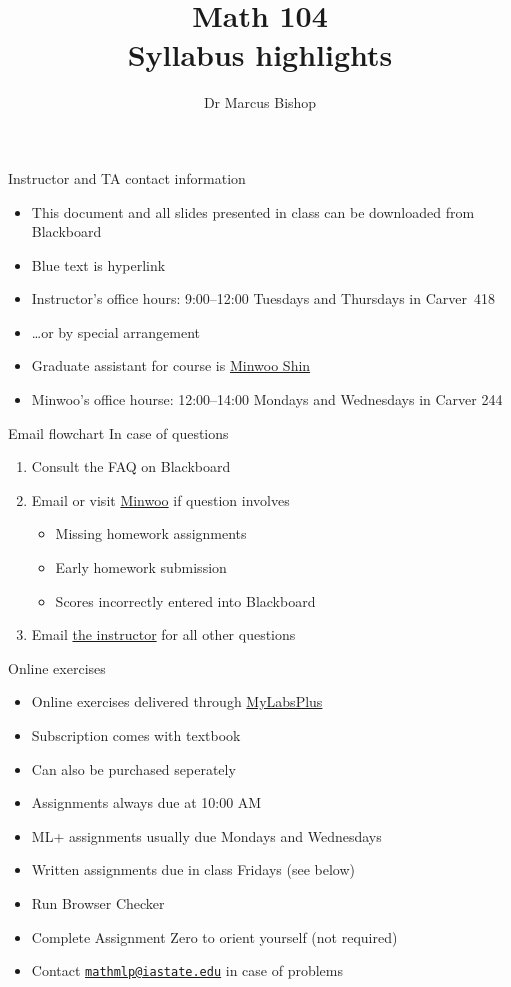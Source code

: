 \documentclass[handout,xcolor=dvipsnames]{beamer}
\title[Syllabus highlights]{Math 104\\Syllabus highlights}
\author{Dr Marcus Bishop}
\theoremstyle{definition}
\begin{document}
\begin{frame}\titlepage\end{frame}
\LogoOff

\begin{frame}{Instructor and TA contact information}
\begin{itemize}
\item This document and all slides presented in class
can be downloaded from Blackboard
\item Blue text is hyperlink
\item Instructor's office hours:
9:00--12:00 Tuesdays and Thursdays in Carver~418
\item \dots or by special arrangement
\item Graduate assistant for course is
\href{mailto:mws@iastate.edu}{\color{blue} Minwoo Shin}
\item Minwoo's office hourse:
12:00--14:00 Mondays and Wednesdays in Carver 244
\end{itemize}
\end{frame}

\begin{frame}{Email flowchart}
In case of questions
\begin{enumerate}
\item Consult the FAQ on Blackboard
\item Email or visit \href{mailto:mws@iastate.edu}{\color{blue}Minwoo}
if question involves
\begin{itemize}
\item Missing homework assignments
\item Early homework submission
\item Scores incorrectly entered into Blackboard
\end{itemize}
\item Email \href{mailto:mbishop@iastate.edu}{\color{blue}the instructor}
for all other questions
\end{enumerate}
\end{frame}

\begin{frame}{Online exercises}
\begin{itemize}
\item Online exercises delivered through
\href{http://iastate.mylabsplus.com}{MyLabsPlus}
\item Subscription comes with textbook
\item Can also be purchased seperately
\item Assignments always due at 10:00 AM
\item ML+ assignments usually due Mondays and Wednesdays
\item Written assignments due in class Fridays (see below)
\item Run Browser Checker
\item Complete Assignment Zero to orient yourself (not required)
\item Contact
\href{mailto://mathmlp@iastate.edu}{\color{blue}\tt mathmlp@iastate.edu}
in case of problems
\end{itemize}
\end{frame}
\end{document}
